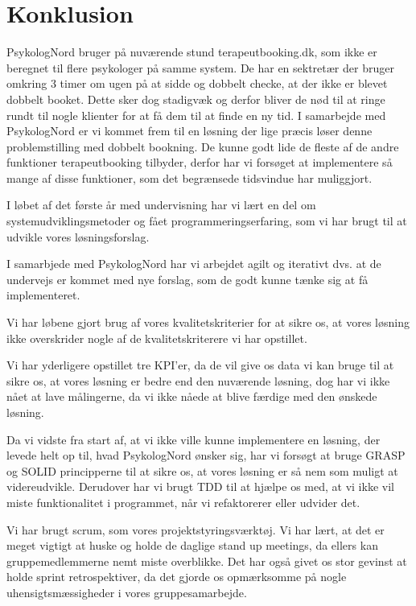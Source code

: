 \section{Konklusion}
PsykologNord bruger på nuværende stund terapeutbooking.dk, som ikke er beregnet til flere psykologer på samme system.
De har en sektretær der bruger omkring 3 timer om ugen på at sidde og dobbelt checke, at der ikke er blevet dobbelt booket.
Dette sker dog stadigvæk og derfor bliver de nød til at ringe rundt til nogle klienter for at få dem til at finde en ny tid.
I samarbejde med PsykologNord er vi kommet frem til en løsning der lige præcis løser denne problemstilling med dobbelt bookning.
De kunne godt lide de fleste af de andre funktioner terapeutbooking tilbyder, derfor har vi forsøget at implementere så mange af disse funktioner, som det begrænsede tidsvindue har muliggjort.

I løbet af det første år med undervisning har vi lært en del om systemudviklingsmetoder og fået programmeringserfaring, som vi har brugt til at udvikle vores løsningsforslag.

I samarbjede med PsykologNord har vi arbejdet agilt og iterativt dvs. at de undervejs er kommet med nye forslag, som de godt kunne tænke sig at få implementeret.

Vi har løbene gjort brug af vores kvalitetskriterier for at sikre os, at vores løsning ikke overskrider nogle af de kvalitetskriterere vi har opstillet.

Vi har yderligere opstillet tre KPI'er, da de vil give os data vi kan bruge til at sikre os, at vores løsning er bedre end den nuværende løsning, dog har vi ikke nået at lave målingerne, da vi ikke nåede at blive færdige med den ønskede løsning.

Da vi vidste fra start af, at vi ikke ville kunne implementere en løsning, der levede helt op til, hvad PsykologNord ønsker sig, har vi forsøgt at bruge GRASP og SOLID principperne til at sikre os, at vores løsning er så nem som muligt at videreudvikle.
Derudover har vi brugt TDD til at hjælpe os med, at vi ikke vil miste funktionalitet i programmet, når vi refaktorerer eller udvider det.

Vi har brugt scrum, som vores projektstyringsværktøj.
Vi har lært, at det er meget vigtigt at huske og holde de daglige stand up meetings, da ellers kan gruppemedlemmerne nemt miste overblikke.
Det har også givet os stor gevinst at holde sprint retrospektiver, da det gjorde os opmærksomme på nogle uhensigtsmæssigheder i vores gruppesamarbejde.